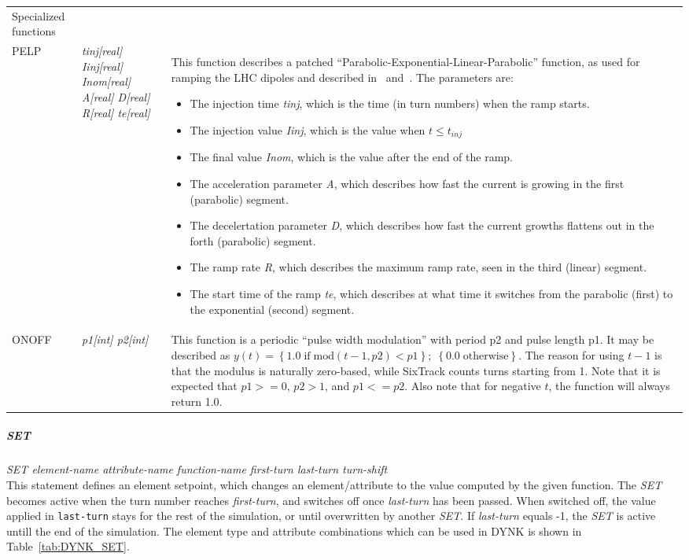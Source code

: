 \documentclass[a4paper,11pt]{report}
\begin{document}
\begin{center}
\begin{longtable}{|p{2.25cm} | p{4cm} p{9.5cm}|}
  \hline
  \rowcolor{blue!15}
  Specialized functions & & \\*

  PELP        & \emph{tinj[real] Iinj[real] Inom[real] A[real] D[real] R[real] te[real]} & 
  This function describes a patched ``Parabolic-Exponential-Linear-Parabolic'' function, as used for ramping the LHC dipoles and described in~\cite[Appendix C]{SRussen:fieldComp} and~\cite{BurlaKing:CurrentRamp}. 
  The parameters are:
  \begin{itemize}
  \setlength\itemsep{-0.3em}
  \item The injection time \emph{tinj}, which is the time (in turn numbers) when the ramp starts.
  \item The injection value \emph{Iinj}, which is the value when $t\le t_{inj}$
  \item The final value \emph{Inom}, which is the value after the end of the ramp.
  \item The acceleration parameter \emph{A}, which describes how fast the current is growing in the first (parabolic) segment.
  \item The decelertation parameter \emph{D}, which describes how fast the current growths flattens out in the forth (parabolic) segment.
  \item The ramp rate \emph{R}, which describes the maximum ramp rate, seen in the third (linear) segment.
  \item The start time of the ramp \emph{te}, which describes at what time it switches from the parabolic (first) to the exponential (second) segment.
  \end{itemize}
  \\*
  ONOFF       & \emph{p1[int] p2[int]} &
  This function is a periodic ``pulse width modulation'' with period p2 and pulse length p1.
  It may be described as
  $y(t) =  \left\{1.0 \; \mathrm{if} \; \mathrm{mod}(t-1,p2) < p1 \right\}; \; \left\{ 0.0 \; \mathrm{otherwise} \right\}$.
  The reason for using $t-1$ is that the modulus is naturally zero-based, while SixTrack counts turns starting from 1.
  Note that it is expected that $p1 >= 0$, $p2 > 1$, and $p1 <= p2$.
  Also note that for negative $t$, the function will always return 1.0.
\end{longtable}
\end{center}


\subparagraph{SET} \emph{SET element-name attribute-name function-name first-turn last-turn turn-shift}\\
This statement defines an element setpoint, which changes an element/attribute to the value computed by the given function.
The \emph{SET} becomes active when the turn number reaches \emph{first-turn}, and switches off once \emph{last-turn} has been passed.
When switched off, the value applied in \texttt{last-turn} stays for the rest of the simulation, or until overwritten by another \emph{SET}.
If \emph{last-turn} equals -1, the \emph{SET} is active untill the end of the simulation.
The element type and attribute combinations which can be used in DYNK is shown in Table~\ref{tab:DYNK_SET}.
\end{document}
